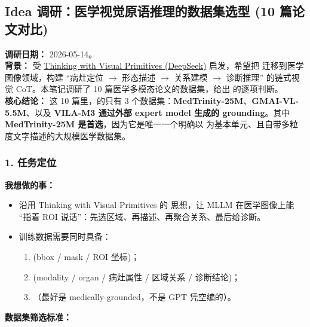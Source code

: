 \subsection*{Idea 调研：医学视觉原语推理的数据集选型 (10 篇论文对比)}
{}

\begin{conceptbox}
\textbf{调研日期：} 2026-05-14。\\
\textbf{背景：} 受 \href{https://arxiv.org/abs/2511.10591}{Thinking with Visual Primitives (DeepSeek)} 启发，希望把  迁移到医学图像领域，构建 ``病灶定位 $\to$ 形态描述 $\to$ 关系建模 $\to$ 诊断推理'' 的链式视觉 CoT。本笔记调研了 10 篇医学多模态论文的数据集，给出  的逐项判断。\\
\textbf{核心结论：} 这 10 篇里，的只有 3 个数据集：\textbf{MedTrinity-25M}、\textbf{GMAI-VL-5.5M}、以及 \textbf{VILA-M3 通过外部 expert model 生成的 grounding}。其中 \textbf{MedTrinity-25M 是首选}，因为它是唯一一个明确以  为基本单元、且自带多粒度文字描述的大规模医学数据集。
\end{conceptbox}

\subsubsection*{1. 任务定位}

\textbf{我想做的事：}

\begin{itemize}[leftmargin=1.5em]
  \item 沿用 Thinking with Visual Primitives 的  思想，让 MLLM 在医学图像上能 ``指着 ROI 说话''：先选区域、再描述、再聚合关系、最后给诊断。
  \item 训练数据需要同时具备：
  \begin{enumerate}[leftmargin=1.5em]
    \item {} (bbox / mask / ROI 坐标)；
    \item {} (modality / organ / 病灶属性 / 区域关系 / 诊断结论)；
    \item {}（最好是 medically-grounded，不是 GPT 凭空编的）。
  \end{enumerate}
\end{itemize}

\textbf{数据集筛选标准：}

